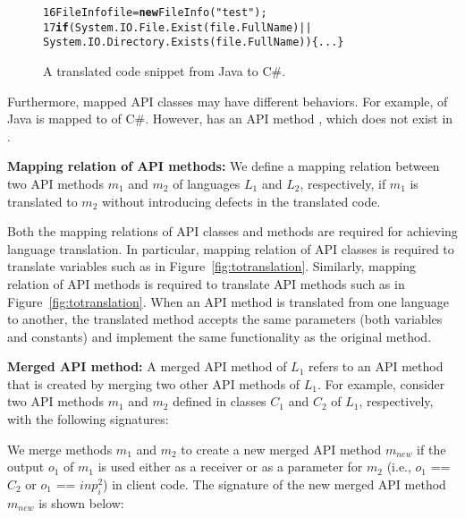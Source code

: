 \begin{figure}[t]
\begin{CodeOut}\vspace*{-1ex}
\begin{alltt}
16  FileInfo file = \textbf{new} FileInfo("test");
17   \textbf{if}(System.IO.File.Exist(file.FullName)||
       System.IO.Directory.Exists(file.FullName))\{...\}
\end{alltt}
\end{CodeOut}\vspace*{-4ex}
\caption{\label{fig:translatedcode} A translated code snippet from
Java to C\#.}\vspace*{-5ex}
\end{figure}

Furthermore, mapped API classes may have different behaviors. For
example,  of Java is mapped to
 of C\#. However,  has
an API method , which does not exist in
.

\textbf{Mapping relation of API methods:} We define a mapping relation
between two API methods $m_1$ and $m_2$ of languages $L_1$ and $L_2$,
respectively, if $m_1$ is translated to $m_2$ without introducing defects
in the translated code.

Both the mapping relations of API classes and methods are required
for achieving language translation. In particular, mapping relation
of API classes is required to translate variables such as
 in Figure~\ref{fig:totranslation}. Similarly, mapping
relation of API methods is required to translate API methods such as
 in Figure~\ref{fig:totranslation}. When an API
method is translated from one language to another, the translated
method accepts the same parameters (both variables and constants)
and implement the same functionality as the original method.

\textbf{Merged API method:} A merged API method of $L_1$ refers to
an API method that is created by merging two other API methods of
$L_1$. For example, consider two API methods $m_1$ and $m_2$ defined
in classes $C_1$ and $C_2$ of $L_1$, respectively, with the
following signatures:



We merge methods $m_1$ and $m_2$ to create a new merged API method $m_{new}$ if the
output $o_1$ of $m_1$ is used either as a receiver or as a
parameter for $m_2$ (i.e., $o_1$ == $C_2$ or $o_1$ == $inp_i^2$)
in client code. The signature of the new merged API method $m_{new}$ is
shown below:

